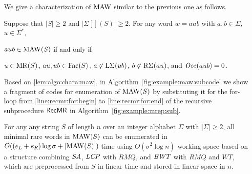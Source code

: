 We give a characterization of $\MAW$ similar to the previous one as follows. 

\begin{lemma}\label{lem:algo:chara:maw}
Suppose that $|S|\ge 2$ and $|\Sigma[](S)|\ge 2$. 
For any word $w = aub$ with $a,b\in\Sigma$,  $u\in\Sigma^*$, 
\begin{enumerate*}[(1)]
\item $aub \in \MAW(S)$ if and only if  
\item $u\in\MR(S)$,
  $au, ub \in \Fac(S)$, 
  $a \not\in \LSigma[](ub)$,
  $b \not\in \RSigma[](au)$,
  and $\Occ[](aub) = 0$. 
\end{enumerate*}
\end{lemma}

Based on \cref{lem:algo:chara:maw},
in Algorithm~\ref{fig:example:maw:subcode}  we show  a fragment of codes for enumeration of $\MAW(S)$
by substituting it for the for-loop from \ref{line:recmr:for:begin} to \ref{line:recmr:for:end} of the recursive subprocedure $\MRRec$ in Algorithm~\ref{fig:example:mrep:sub}.

\begin{theorem}\label{thm:algo:mrw}
  For any any string $S$ of length $n$ over an integer alphabet $\Sigma$ with $|\Sigma| \ge 2$, all minimal rare words in $\MAW(S)$ can be enumerated
  in $O((e_L + e_R)\log\sigma + |\MAW(S)|)$ time using
  $O(\sigma^2\log n)$ working space
  based on a structure combining $\SA$, $\LCP$ with $RMQ$, and $\BWT$ with $RMQ$  and $WT$,  which are preprocessed from $S$ in linear time and stored in linear space in $n$. 
\end{theorem}





